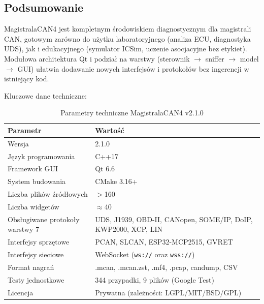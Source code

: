 \documentclass[12pt, a4paper]{article}
\begin{document}
\subsection{Podsumowanie}

MagistralaCAN4 jest kompletnym środowiskiem diagnostycznym dla magistrali CAN,
gotowym zarówno do użytku laboratoryjnego (analiza ECU, diagnostyka UDS),
jak i edukacyjnego (symulator ICSim, uczenie asocjacyjne bez etykiet).
Modułowa architektura Qt i podział na warstwy (sterownik $\to$ sniffer $\to$ model $\to$ GUI)
ułatwia dodawanie nowych interfejsów i protokołów bez ingerencji
w istniejący kod.

Kluczowe dane techniczne:

\begin{table}[H]
\caption{Parametry techniczne MagistralaCAN4 v2.1.0}
\label{tab:summary}
\centering
\small
\begin{tabular}{p{6.5cm}p{8.5cm}}
\toprule
\textbf{Parametr} & \textbf{Wartość} \\
\midrule
Wersja                          & 2.1.0 \\
Język programowania             & C++17 \\
Framework GUI                   & Qt 6.6 \\
System budowania                & CMake 3.16+ \\
Liczba plików źródłowych        & $>$160 \\
Liczba widgetów                 & $\approx$40 \\
Obsługiwane protokoły warstwy 7 &
  UDS, J1939, OBD-II, CANopen, SOME/IP, DoIP, KWP2000, XCP, LIN \\
Interfejsy sprzętowe            & PCAN, SLCAN, ESP32-MCP2515, GVRET \\
Interfejsy sieciowe             & WebSocket (\texttt{ws://} oraz \texttt{wss://}) \\
Format nagrań                   & .mcan, .mcan.zst, .mf4, .pcap, candump, CSV \\
Testy jednostkowe               & 344 przypadki, 9 plików (Google Test) \\
Licencja                        & Prywatna (zależności: LGPL/MIT/BSD/GPL) \\
\bottomrule
\end{tabular}
\end{table}
\end{document}
